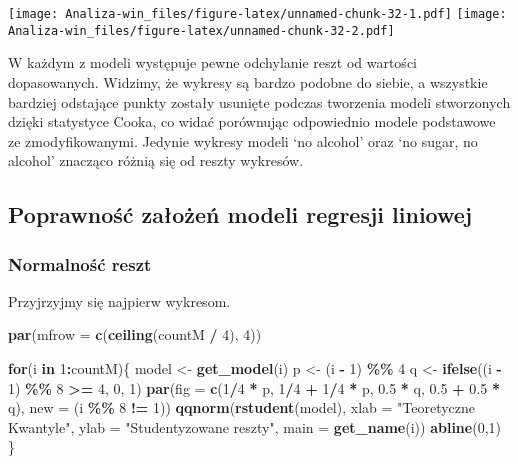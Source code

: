 \documentclass[
]{article}
\newenvironment{Shaded}{\begin{snugshade}}{\end{snugshade}}
\newcommand{\AttributeTok}[1]{\textcolor[rgb]{0.13,0.29,0.53}{#1}}
\newcommand{\ControlFlowTok}[1]{\textcolor[rgb]{0.13,0.29,0.53}{\textbf{#1}}}
\newcommand{\DecValTok}[1]{\textcolor[rgb]{0.00,0.00,0.81}{#1}}
\newcommand{\FloatTok}[1]{\textcolor[rgb]{0.00,0.00,0.81}{#1}}
\newcommand{\FunctionTok}[1]{\textcolor[rgb]{0.13,0.29,0.53}{\textbf{#1}}}
\newcommand{\NormalTok}[1]{#1}
\newcommand{\OtherTok}[1]{\textcolor[rgb]{0.56,0.35,0.01}{#1}}
\newcommand{\SpecialCharTok}[1]{\textcolor[rgb]{0.81,0.36,0.00}{\textbf{#1}}}
\newcommand{\StringTok}[1]{\textcolor[rgb]{0.31,0.60,0.02}{#1}}
\begin{document}
\texttt{[image: Analiza-win\_files/figure-latex/unnamed-chunk-32-1.pdf]}
\texttt{[image: Analiza-win\_files/figure-latex/unnamed-chunk-32-2.pdf]}

W każdym z modeli występuje pewne odchylanie reszt od wartości
dopasowanych. Widzimy, że wykresy są bardzo podobne do siebie, a
wszystkie bardziej odstające punkty zostały usunięte podczas tworzenia
modeli stworzonych dzięki statystyce Cooka, co widać porównując
odpowiednio modele podstawowe ze zmodyfikowanymi. Jedynie wykresy modeli
`no alcohol' oraz `no sugar, no alcohol' znacząco różnią się od reszty
wykresów.

\subsection{Poprawność założeń modeli regresji
liniowej}\label{poprawnoux15bux107-zaux142oux17ceux144-modeli-regresji-liniowej}

\subsubsection{Normalność reszt}\label{normalnoux15bux107-reszt}

Przyjrzyjmy się najpierw wykresom.

\begin{Shaded}
\begin{Highlighting}[]
\FunctionTok{par}\NormalTok{(}\AttributeTok{mfrow =} \FunctionTok{c}\NormalTok{(}\FunctionTok{ceiling}\NormalTok{(countM }\SpecialCharTok{/} \DecValTok{4}\NormalTok{), }\DecValTok{4}\NormalTok{))}

\ControlFlowTok{for}\NormalTok{(i }\ControlFlowTok{in} \DecValTok{1}\SpecialCharTok{:}\NormalTok{countM)\{}
\NormalTok{  model }\OtherTok{\textless{}{-}} \FunctionTok{get\_model}\NormalTok{(i)}
\NormalTok{  p }\OtherTok{\textless{}{-}}\NormalTok{ (i }\SpecialCharTok{{-}} \DecValTok{1}\NormalTok{) }\SpecialCharTok{\%\%} \DecValTok{4}
\NormalTok{  q }\OtherTok{\textless{}{-}} \FunctionTok{ifelse}\NormalTok{((i }\SpecialCharTok{{-}} \DecValTok{1}\NormalTok{) }\SpecialCharTok{\%\%} \DecValTok{8} \SpecialCharTok{\textgreater{}=} \DecValTok{4}\NormalTok{, }\DecValTok{0}\NormalTok{, }\DecValTok{1}\NormalTok{)}
  \FunctionTok{par}\NormalTok{(}\AttributeTok{fig =} \FunctionTok{c}\NormalTok{(}\DecValTok{1}\SpecialCharTok{/}\DecValTok{4} \SpecialCharTok{*}\NormalTok{ p, }\DecValTok{1}\SpecialCharTok{/}\DecValTok{4} \SpecialCharTok{+} \DecValTok{1}\SpecialCharTok{/}\DecValTok{4} \SpecialCharTok{*}\NormalTok{ p, }\FloatTok{0.5} \SpecialCharTok{*}\NormalTok{ q, }\FloatTok{0.5} \SpecialCharTok{+} \FloatTok{0.5} \SpecialCharTok{*}\NormalTok{ q), }\AttributeTok{new =}\NormalTok{ (i }\SpecialCharTok{\%\%} \DecValTok{8} \SpecialCharTok{!=} \DecValTok{1}\NormalTok{))}
  \FunctionTok{qqnorm}\NormalTok{(}\FunctionTok{rstudent}\NormalTok{(model), }\AttributeTok{xlab =} \StringTok{"Teoretyczne Kwantyle"}\NormalTok{, }\AttributeTok{ylab =} \StringTok{"Studentyzowane reszty"}\NormalTok{, }\AttributeTok{main =} \FunctionTok{get\_name}\NormalTok{(i))}
  \FunctionTok{abline}\NormalTok{(}\DecValTok{0}\NormalTok{,}\DecValTok{1}\NormalTok{)}
\NormalTok{\}}
\end{Highlighting}
\end{Shaded}
\end{document}
